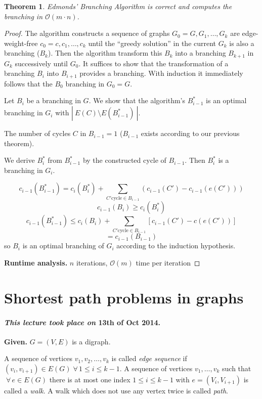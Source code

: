 \documentclass{article}
\newtheorem{theorem}{Theorem}
\newcommand{\card}[1]{\left|\:\!#1\:\!\right|}
\newcommand{\given}[1]{\textbf{Given.} #1\par}
\newcommand{\dateref}[1]{\paragraph{\textit{This lecture took place on} #1.}}
\newcommand{\fall}{\;\forall\,}
\begin{document}
\begin{theorem}\label{satz-2.11}
Edmonds' Branching Algorithm is correct and computes the branching in $\mathcal{O}(m\cdot n)$.
\end{theorem}

\begin{proof}
The algorithm constructs a sequence of graphs $G_0 = G, G_1, \ldots, G_k$ are edge-weight-free $c_0 = c, c_1, \ldots, c_k$ until the ``greedy solution'' in the current $G_k$ is also a branching ($B_k$). Then the algorithm transform this $B_k$ into a branching $B_{k+1}$ in $G_k$ successively until $G_0$. It suffices to show that the transformation of a branching $B_i$ into $B_{i+1}$ provides a branching. With induction it immediately follows that the $B_0$ branching in $G_0 = G$.

Let $B_i$ be a branching in $G$. We show that the algorithm's $B^*_{i-1}$ is an optimal branching in $G_i$ with $\card{E(C) \setminus E(B^*_{i-1})}$.

The number of cycles $C$ in $B_{i-1} = 1$ ($B_{i-1}$ exists according to our previous theorem).

We derive $B^*_i$ from $B^*_{i-1}$ by the constructed cycle of $B_{i-1}$. Then $B^*_i$ is a branching in $G_i$.

\[
  c_{i-1}(B_{i-1}^*) = c_i(B_i^*) + \sum_{C' \text{cycle} \in B_{i-1}}(c_{i-1}(C') - c_{i-1}(e(C')))
\] \[
  c_{i-1}(B_i) \geq c_i(B^*_i)
\] \[
  c_{i-1}(B_{i-1}^*) \leq c_i(B_i) + \sum_{C' \text{cycle} \in B_{i-1}} \left[ c_{i-1}(C') - c(e(C')) \right]
\] \[
  = c_{i-1}(B_{i-1})
\]
so $B_i$ is an optimal branching of $G_i$ according to the induction hypothesis.

\textbf{Runtime analysis.}
  $n$ iterations, $\mathcal{O}(m)$ time per iteration
\end{proof}

\section{Shortest path problems in graphs}
%
\dateref{13th of Oct 2014}

\given{$G = (V, E)$ is a digraph.}

A sequence of vertices $v_1, v_2, \ldots, v_k$ is called \emph{edge sequence} if $(v_i, v_{i+1}) \in E(G) \fall 1 \leq i \leq k-1$. A sequence of vertices $v_1, \ldots, v_k$ such that $\fall e \in E(G)$ there is at most one index $1 \leq i \leq k-1$ with $e = (V_i, V_{i+1})$ is called a \emph{walk}. A walk which does not use any vertex twice is called \emph{path}.
\end{document}
